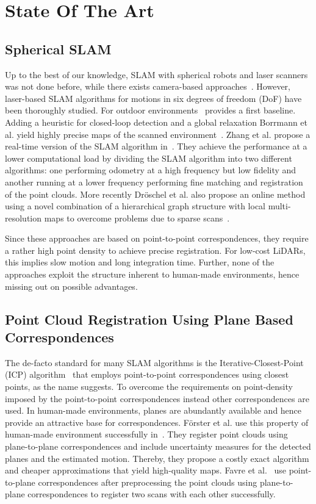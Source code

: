 \section{State Of The Art}

\subsection{Spherical SLAM}

Up to the best of our knowledge, SLAM with spherical robots and laser scanners was not done before, while there exists camera-based approaches~\cite{9233654}.
However, laser-based SLAM algorithms for motions in six degrees of freedom (DoF) have been thoroughly studied.
For outdoor environments~\cite{JFR2006} provides a first baseline.
Adding a heuristic for closed-loop detection and a global relaxation Borrmann et al. yield highly precise maps of the scanned environment~\cite{RAS2007}.
Zhang et al. propose a real-time version of the SLAM algorithm in~\cite{Zhang2014}.
They achieve the performance at a lower computational load by dividing the SLAM algorithm into two different algorithms: one performing odometry at a high frequency but low fidelity and another running at a lower frequency performing fine matching and registration of the point clouds.
More recently Dröschel et al. also propose an online method using a novel combination of a hierarchical graph structure with local multi-resolution maps to overcome problems due to sparse scans~\cite{Droeschel2018}.

Since these approaches are based on point-to-point correspondences, they require a rather high point density to achieve precise registration.
For low-cost LiDARs, this implies slow motion and long integration time.
Further, none of the approaches exploit the structure inherent to human-made environments, hence missing out on possible advantages.

\subsection{Point Cloud Registration Using Plane Based Correspondences}

The de-facto standard for many SLAM algorithms is the Iterative-Closest-Point (ICP) algorithm~\cite{Besl1992} that employs point-to-point correspondences using closest points, as the name suggests. 
To overcome the requirements on point-density imposed by the point-to-point correspondences instead other correspondences are used. 
In human-made environments, planes are abundantly available and hence provide an attractive base for correspondences.
Förster et al. use this property of human-made environment successfully in~\cite{Foerstner2017}.
They register point clouds using plane-to-plane correspondences and include uncertainty measures for the detected planes and the estimated motion.
Thereby, they propose a costly exact algorithm and cheaper approximations that yield high-quality maps.
Favre et al.~\cite{favre2021} use point-to-plane correspondences after preprocessing the point clouds using plane-to-plane correspondences to register two scans with each other successfully.

